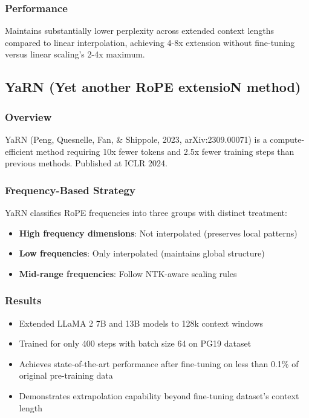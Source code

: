 \documentclass[11pt,letterpaper]{article}
\begin{document}
\subsubsection{Performance}
Maintains substantially lower perplexity across extended context lengths compared to linear interpolation, achieving 4-8x extension without fine-tuning versus linear scaling's 2-4x maximum.

\subsection{YaRN (Yet another RoPE extensioN method)}

\subsubsection{Overview}
YaRN (Peng, Quesnelle, Fan, \& Shippole, 2023, arXiv:2309.00071) is a compute-efficient method requiring 10x fewer tokens and 2.5x fewer training steps than previous methods. Published at ICLR 2024.

\subsubsection{Frequency-Based Strategy}
YaRN classifies RoPE frequencies into three groups with distinct treatment:
\begin{itemize}[leftmargin=*]
    \item \textbf{High frequency dimensions}: Not interpolated (preserves local patterns)
    \item \textbf{Low frequencies}: Only interpolated (maintains global structure)
    \item \textbf{Mid-range frequencies}: Follow NTK-aware scaling rules
\end{itemize}

\subsubsection{Results}
\begin{itemize}[leftmargin=*]
    \item Extended LLaMA 2 7B and 13B models to 128k context windows
    \item Trained for only 400 steps with batch size 64 on PG19 dataset
    \item Achieves state-of-the-art performance after fine-tuning on less than 0.1\% of original pre-training data
    \item Demonstrates extrapolation capability beyond fine-tuning dataset's context length
\end{itemize}
\end{document}
